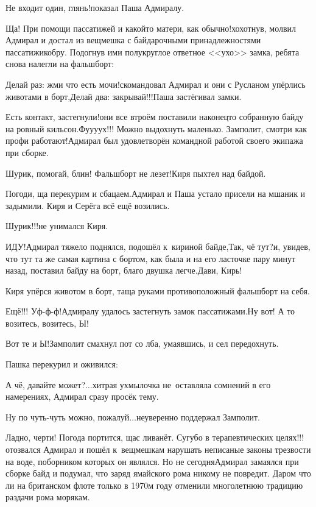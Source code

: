 \diagdash Не входит один, глянь!\mdash показал Паша Адмиралу.

\diagdash Ща! При помощи пассатижей и какой\sdash то матери, как обычно!\mdash хохотнув, молвил Адмирал и достал из вещмешка с байдарочными принадлежностями пассатижи\sdash кобру. Подогнув ими полукруглое ответное <<ухо>> замка, ребята снова налегли на фальшборт:

\diagdash Делай раз: жми что есть мочи!\mdash скомандовал Адмирал и они с Русланом упёрлись животами в борт,\mdash Делай два: закрывай!!!\mdash Паша застёгивал замки.

\diagdash Есть контакт, застегнули!\mdash они все втроём поставили наконец\sdash то собранную байду на ровный кильсон.\mdash Фу\sdash у\sdash у\sdash ух!!! Можно выдохнуть маленько. Замполит, смотри как профи работают!\mdash Адмирал был удовлетворён командной работой своего экипажа при сборке.

\diagdash Шурик, помогай, блин! Фальшборт не лезет!\mdash Киря пыхтел над байдой.

\diagdash Погоди, ща перекурим и сбацаем.\mdash Адмирал и Паша устало присели на мшаник и задымили. Киря и Серёга всё ещё возились. 

\diagdash Шурик!!!\mdash не унимался Киря.

\diagdash ИДУ!\mdash Адмирал тяжело поднялся, подошёл к~кириной байде,\mdash Так, чё тут?\mdash и, увидев, что тут та же самая картина с бортом, как была и на его ласточке пару минут назад, поставил байду на борт, благо двушка легче.\mdash Дави, Кирь!

Киря упёрся животом в борт, таща руками противоположный фальшборт на себя.

\diagdash Ещё!!! Уф-ф-ф!\mdash Адмиралу удалось застегнуть замок пассатижами.\mdash Ну вот! А то возитесь, возитесь, Ы!

\diagdash Вот те и Ы!\mdash Замполит смахнул пот со лба, умаявшись, и сел передохнуть.

Пашка перекурил и оживился:

\diagdash А чё, давайте может?$\ldots$\mdash хитрая ухмылочка не~оставляла сомнений в его намерениях, Адмирал сразу просёк тему.

\diagdash Ну по чуть-чуть можно, пожалуй$\ldots$\mdash неуверенно поддержал Замполит.

\diagdash Ладно, черти! Погода портится, щас ливанёт. Сугубо в терапевтических целях!!!\mdash отозвался Адмирал и пошёл к~вещмешкам нарушать неписаные законы трезвости на воде, поборником которых он являлся. Но не сегодня\mdash Адмирал замаялся при сборке байд и подумал, что заряд ямайского рома никому не повредит. Даром что ли на британском флоте только в 1970\sdash м году отменили многолетнюю традицию раздачи рома морякам.

